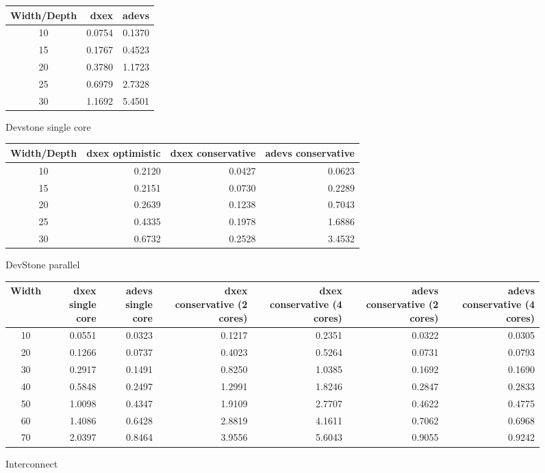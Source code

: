 \documentclass[a4paper, 11pt]{article}
\begin{document}
\begin{figure}
\begin{center}
\begin{tabular}{|c|r|r|}
\hline
Width/Depth&dxex&adevs \\
\hline
10&0.0754&0.1370\\
15&0.1767&0.4523\\
20&0.3780&1.1723\\
25&0.6979&2.7328\\
30&1.1692&5.4501\\
\hline
\end{tabular}
\end{center}
\caption{Devstone single core}
\end{figure}

\begin{figure}
\begin{center}
\begin{tabular}{|c|r|r|r|}
\hline
Width/Depth&dxex optimistic&dxex conservative&adevs conservative \\
\hline
10&0.2120&0.0427&0.0623\\
15&0.2151&0.0730&0.2289\\
20&0.2639&0.1238&0.7043\\
25&0.4335&0.1978&1.6886\\
30&0.6732&0.2528&3.4532\\
\hline
\end{tabular}
\end{center}
\caption{DevStone parallel}
\end{figure}

\begin{figure}
\begin{center}
\begin{tabular}{|c|r|r|r|r|r|r|}
\hline
Width&dxex single core&adevs single core&dxex conservative (2 cores)&dxex conservative (4 cores)&adevs conservative (2 cores)&adevs conservative (4 cores) \\
\hline
10&0.0551&0.0323&0.1217&0.2351&0.0322&0.0305\\
20&0.1266&0.0737&0.4023&0.5264&0.0731&0.0793\\
30&0.2917&0.1491&0.8250&1.0385&0.1692&0.1690\\
40&0.5848&0.2497&1.2991&1.8246&0.2847&0.2833\\
50&1.0098&0.4347&1.9109&2.7707&0.4622&0.4775\\
60&1.4086&0.6428&2.8819&4.1611&0.7062&0.6968\\
70&2.0397&0.8464&3.9556&5.6043&0.9055&0.9242\\
\hline
\end{tabular}
\end{center}
\caption{Interconnect}
\end{figure}
\end{document}
